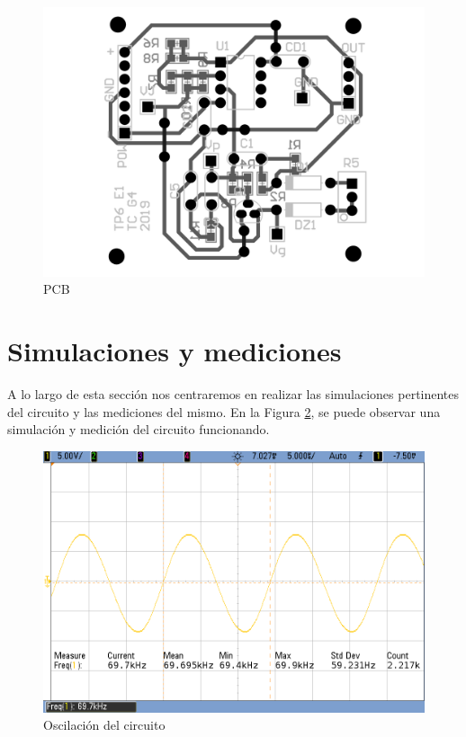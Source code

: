 \begin{figure}[H]
\begin{centering}
\includegraphics[scale=0.25]{../Ex1/Resources/PCB}
\par\end{centering}
\caption{PCB}
\label{1_11}

\end{figure}

\section{Simulaciones y mediciones}

A lo largo de esta sección nos centraremos en realizar las simulaciones
pertinentes del circuito y las mediciones del mismo. En la Figura
\ref{1_16}, se puede observar una simulación y medición del circuito
funcionando.

\begin{figure}[H]
\begin{centering}
\includegraphics[scale=0.35]{../Ex1/Resources/Oscilacion}
\par\end{centering}
\caption{Oscilación del circuito}
\label{1_16}

\end{figure}

